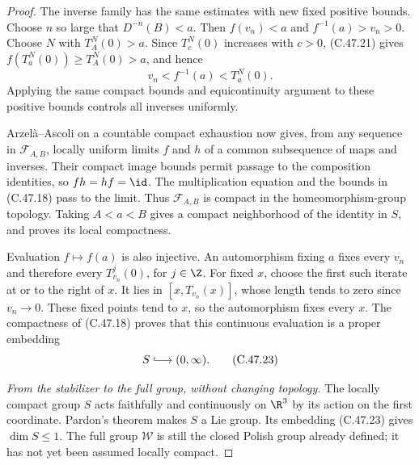 \begin{proof}
The inverse family has the same estimates with new fixed
positive bounds. Choose $n$ so large that $D^{-n}(B)<a$.
Then $f(v_n)<a$ and $f^{-1}(a)>v_n>0$.
Choose $N$ with $T_A^N(0)>a$. Since $T_c^N(0)$ increases
with $c>0$, (C.47.21) gives
$f(T_a^N(0))\geq T_A^N(0)>a$, and hence
\[
                     v_n<f^{-1}(a)<T_a^N(0).            \tag{C.47.22}
\]
Applying the same compact bounds and equicontinuity argument
to these positive bounds controls all inverses uniformly.

Arzel\`a--Ascoli on a countable compact exhaustion now gives,
from any sequence in $\mathcal F_{A,B}$, locally uniform
limits $f$ and $h$ of a common subsequence of maps and inverses.
Their compact image bounds permit passage to the composition
identities, so $fh=hf=\id$.
The multiplication equation and the bounds in (C.47.18)
pass to the limit. Thus $\mathcal F_{A,B}$ is compact in the
homeomorphism-group topology.
Taking $A<a<B$ gives a compact neighborhood of the identity
in $S$, and proves its local compactness.

Evaluation $f\mapsto f(a)$ is also injective.
An automorphism fixing $a$ fixes every $v_n$ and therefore every
$T_{v_n}^j(0)$, for $j\in\Z$.
For fixed $x$, choose the first such iterate at or to the right
of $x$. It lies in $[x,T_{v_n}(x)]$, whose length tends to
zero since $v_n\to0$. These fixed points tend to $x$, so
the automorphism fixes every $x$.
The compactness of (C.47.18) proves that this continuous
evaluation is a proper embedding
\[
                              S\lhook\joinrel\longrightarrow(0,\infty).
                                                        \tag{C.47.23}
\]

\emph{From the stabilizer to the full group, without changing topology.}
The locally compact group $S$ acts faithfully and continuously
on $\R^3$ by its action on the first coordinate.
Pardon's theorem makes $S$ a Lie group.
Its embedding (C.47.23) gives $\dim S\leq1$.
The full group $\mathcal W$ is still the closed Polish group
already defined; it has not yet been assumed locally compact.


\end{proof}
